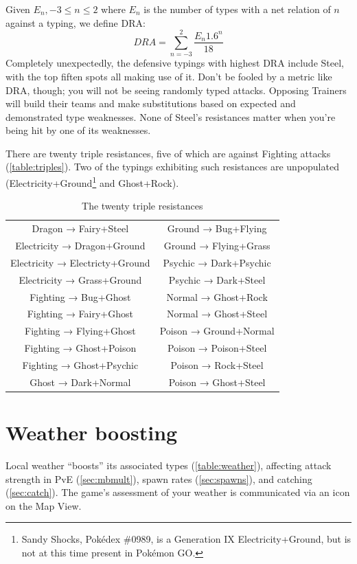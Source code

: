 Given $E_{n}, -3 \le n \le 2$ where $E_n$ is the number of types with
  a net relation of $n$ against a typing, we define DRA\@:
\[  DRA = \sum_{n=-3}^{2} \frac{E_{n}1.6^n}{18} \]
Completely unexpectedly, the defensive typings with highest DRA include Steel,
  with the top fiften spots all making use of it.
Don't be fooled by a metric like DRA, though; you will not be seeing
  randomly typed attacks.
Opposing Trainers will build their teams and make substitutions based on
  expected and demonstrated type weaknesses.
None of Steel's resistances matter when you're being hit by one of its
  weaknesses.



There are twenty triple resistances, five of which are against Fighting attacks (\autoref{table:triples}).
Two of the typings exhibiting such resistances are unpopulated
  (Electricity+Ground\footnote{Sandy Shocks, Pokédex \#0989, is a Generation IX
  Electricity+Ground, but is not at this time present in Pokémon GO.} and Ghost+Rock).
\begin{table}[h]
  \begin{center}
    \begin{tabular}{cc}
Dragon → Fairy+Steel & Ground → Bug+Flying \\
Electricity → Dragon+Ground & Ground → Flying+Grass \\
Electricity → Electricty+Ground & Psychic → Dark+Psychic \\
Electricity → Grass+Ground & Psychic → Dark+Steel \\
Fighting → Bug+Ghost & Normal → Ghost+Rock \\
Fighting → Fairy+Ghost & Normal → Ghost+Steel \\
Fighting → Flying+Ghost & Poison → Ground+Normal \\
Fighting → Ghost+Poison & Poison → Poison+Steel \\
Fighting → Ghost+Psychic & Poison → Rock+Steel \\
Ghost → Dark+Normal & Poison → Ghost+Steel \\
    \end{tabular}
    \caption{The twenty triple resistances}
    \label{table:triples}
  \end{center}
\end{table}

\section{Weather boosting}
\label{sec:weather}
Local weather ``boosts'' its associated types (\autoref{table:weather}), affecting attack strength
 in PvE (\autoref{sec:mbmult}),
 spawn rates (\autoref{sec:spawns}), and catching (\autoref{sec:catch}).
The game's assessment of your weather is communicated via an icon on the Map View.
\begin{table}[ht]

\end{table}
